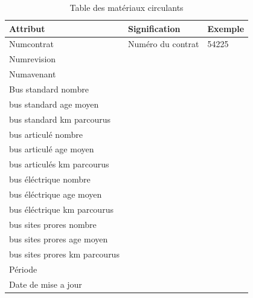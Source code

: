 \documentclass[a4paper]{report}
\begin{document}
\begin{doublespace}
	\begin{table}[H]
		\begin{center}
			\begin{tabularx}{17.5cm}{|X|p{3cm}|p{1.5cm}|}
				\hline
				\textbf{Attribut}             & \textbf{Signification} & \textbf{Exemple} \\
				\hline
				Numcontrat                    & Numéro du contrat      & 54225            \\
				\hline
				Numrevision                   &                        &                  \\
				\hline
				Numavenant                    &                        &                  \\
				\hline
				Bus standard nombre           &                        &                  \\
				\hline
				bus standard age moyen        &                        &                  \\
				\hline
				bus standard km parcourus     &                        &                  \\
				\hline
				bus articulé nombre           &                        &                  \\
				\hline
				bus articulé age moyen        &                        &                  \\
				\hline
				bus articulés km parcourus    &                        &                  \\
				\hline
				bus éléctrique nombre         &                        &                  \\
				\hline
				bus éléctrique age moyen      &                        &                  \\
				\hline
				bus éléctrique km parcourus   &                        &                  \\
				\hline
				bus sites prores nombre       &                        &                  \\
				\hline
				bus sites prores age moyen    &                        &                  \\
				\hline
				bus sites prores km parcourus &                        &                  \\
				\hline
				Période                       &                        &                  \\
				\hline
				Date de mise a jour           &                        &                  \\
				\hline
			\end{tabularx}
			\caption{Table des matériaux circulants}
		\end{center}
	\end{table}


\end{doublespace}
\end{document}
